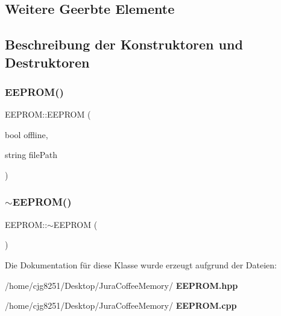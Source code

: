 \subsection*{Weitere Geerbte Elemente}


\subsection{Beschreibung der Konstruktoren und Destruktoren}
\mbox{\label{class_e_e_p_r_o_m_a60c5bf54e6c1548bd2182a97d1c4cd09}} 
\subsubsection{E\+E\+P\+R\+O\+M()}
{\footnotesize\ttfamily E\+E\+P\+R\+O\+M\+::\+E\+E\+P\+R\+OM (\begin{DoxyParamCaption}\item[{bool}]{offline,  }\item[{string}]{file\+Path }\end{DoxyParamCaption})}

\mbox{\label{class_e_e_p_r_o_m_a8ed8926ed310a36b58940d9812829a97}} 
\subsubsection{$\sim$\+E\+E\+P\+R\+O\+M()}
{\footnotesize\ttfamily E\+E\+P\+R\+O\+M\+::$\sim$\+E\+E\+P\+R\+OM (\begin{DoxyParamCaption}{ }\end{DoxyParamCaption})\hspace{0.3cm}{\ttfamily [virtual]}}



Die Dokumentation für diese Klasse wurde erzeugt aufgrund der Dateien\+:\begin{DoxyCompactItemize}
\item 
/home/cjg8251/\+Desktop/\+Jura\+Coffee\+Memory/\textbf{ E\+E\+P\+R\+O\+M.\+hpp}\item 
/home/cjg8251/\+Desktop/\+Jura\+Coffee\+Memory/\textbf{ E\+E\+P\+R\+O\+M.\+cpp}\end{DoxyCompactItemize}
